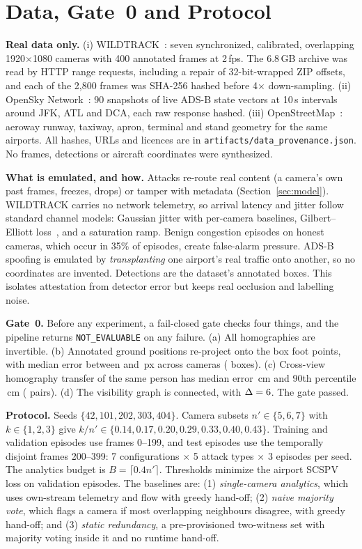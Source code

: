\documentclass[journal]{IEEEtran}
\theoremstyle{remark}
\begin{document}
\section{Data, Gate~0 and Protocol}\label{sec:data}
\textbf{Real data only.} (i) WILDTRACK~\cite{chavdarova2018wildtrack}: seven synchronized, calibrated, overlapping
1920$\times$1080 cameras with 400 annotated frames at 2\,fps. The 6.8\,GB archive was read by HTTP range requests,
including a repair of 32-bit-wrapped ZIP offsets, and each of the 2,800 frames was SHA-256 hashed before 4$\times$
down-sampling. (ii) OpenSky Network~\cite{schafer2014opensky}: 90 snapshots of live ADS-B state vectors at 10\,s
intervals around JFK, ATL and DCA, each raw response hashed. (iii) OpenStreetMap~\cite{osm}: aeroway runway, taxiway,
apron, terminal and stand geometry for the same airports. All hashes, URLs and licences are in
\texttt{artifacts/data\_provenance.json}. No frames, detections or aircraft coordinates were synthesized.

\textbf{What is emulated, and how.} Attacks re-route real content (a camera's own past frames, freezes, drops) or tamper
with metadata (Section~\ref{sec:model}). WILDTRACK carries no network telemetry, so arrival latency and jitter follow
standard channel models: Gaussian jitter with per-camera baselines, Gilbert--Elliott loss~\cite{gilbert1960capacity},
and a saturation ramp. Benign congestion episodes on honest cameras, which occur in 35\% of episodes, create
false-alarm pressure. ADS-B spoofing is emulated by \emph{transplanting} one airport's real traffic onto another, so no
coordinates are invented. Detections are the dataset's annotated boxes. This isolates attestation from detector error
but keeps real occlusion and labelling noise.

\textbf{Gate~0.} Before any experiment, a fail-closed gate checks four things, and the pipeline returns
\texttt{NOT\_EVALUABLE} on any failure. (a) All homographies are invertible. (b) Annotated ground positions re-project
onto the box foot points, with median error between \GzeroReprojMin{} and \GzeroReprojMax{}\,px across cameras
(\GzeroBoxes{} boxes). (c) Cross-view homography transfer of the same person has median error \GzeroTransferMed{}\,cm
and 90th percentile \GzeroTransferPninety{}\,cm (\GzeroPairs{} pairs). (d) The visibility graph is connected, with
$\Delta=6$. The gate passed.

\textbf{Protocol.} Seeds $\{42,101,202,303,404\}$. Camera subsets $n'\in\{5,6,7\}$ with $k\in\{1,2,3\}$ give
$k/n'\in\{0.14,0.17,0.20,0.29,0.33,0.40,0.43\}$. Training and validation episodes use frames 0--199, and test episodes
use the temporally disjoint frames 200--399: 7 configurations $\times$ 5 attack types $\times$ 3 episodes per seed. The
analytics budget is $B=\lceil 0.4n'\rceil$. Thresholds minimize the airport SCSPV loss on validation episodes. The
baselines are: (1) \emph{single-camera analytics}, which uses own-stream telemetry and flow with greedy hand-off; (2)
\emph{naive majority vote}, which flags a camera if most overlapping neighbours disagree, with greedy hand-off; and (3)
\emph{static redundancy}, a pre-provisioned two-witness set with majority voting inside it and no runtime hand-off.
\end{document}

